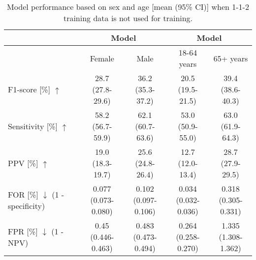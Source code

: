 {%
\begin{table}[h]
    \centering
    \caption{Model performance based on sex and age [mean (95\% CI)] when 1-1-2 training data is not used for training.}
    \label{tab_retrospective:tableA2}
    \begin{tabular}{l|cc|cc}
        \toprule

         & \multicolumn{2}{c|}{Model} & \multicolumn{2}{c}{Model} \\
        \midrule
         & Female & Male & 18-64 years & 65+ years \\

        \midrule

        F1-score [\%] $\uparrow$ & \makecell{28.7 \\ (27.8-29.6)} & \makecell{36.2 \\ (35.3-37.2)} & \makecell{20.5 \\ (19.5-21.5)} & \makecell{39.4 \\ (38.6-40.3)} \\
        \midrule
        Sensitivity [\%] $\uparrow$ & \makecell{58.2 \\ (56.7-59.9)} & \makecell{62.1 \\ (60.7-63.6)} & \makecell{53.0 \\ (50.9-55.0)} & \makecell{63.0 \\ (61.9-64.3)} \\
        \midrule
        PPV [\%] $\uparrow$ & \makecell{19.0 \\ (18.3-19.7)} & \makecell{25.6 \\ (24.8-26.4)} & \makecell{12.7 \\ (12.0-13.4)} & \makecell{28.7 \\ (27.9-29.5)} \\
        \midrule
        \makecell[l]{FOR [\%] $\downarrow$ \\ (1 - specificity)}  & \makecell{0.077 \\ (0.073-0.080)} & \makecell{0.102 \\ (0.097-0.106)} & \makecell{0.034 \\ (0.032-0.036)} & \makecell{0.318 \\ (0.305-0.331)} \\
        \midrule
        \makecell[l]{FPR [\%] $\downarrow$ \\ (1 - NPV)} & \makecell{0.45 \\ (0.446-0.463)} & \makecell{0.483 \\ (0.473-0.494)} & \makecell{0.264 \\ (0.258-0.270)} & \makecell{1.335 \\ (1.308-1.362)} \\


\end{tabular}
\end{table}}
